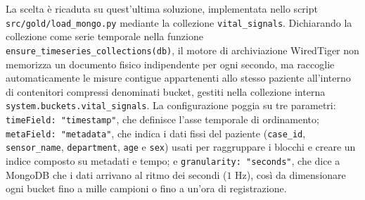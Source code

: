 La scelta \`e ricaduta su quest'ultima soluzione, implementata nello script \texttt{src/gold/load\_mongo.py} mediante la collezione \texttt{vital\_signals}. Dichiarando la collezione come serie temporale nella funzione \texttt{ensure\_timeseries\_collections(db)}, il motore di archiviazione WiredTiger non memorizza un documento fisico indipendente per ogni secondo, ma raccoglie automaticamente le misure contigue appartenenti allo stesso paziente all'interno di contenitori compressi denominati bucket, gestiti nella collezione interna \texttt{system.buckets.vital\_signals}. La configurazione poggia su tre parametri: \texttt{timeField: "timestamp"}, che definisce l'asse temporale di ordinamento; \texttt{metaField: "metadata"}, che indica i dati fissi del paziente (\texttt{case\_id}, \texttt{sensor\_name}, \texttt{department}, \texttt{age} e \texttt{sex}) usati per raggruppare i blocchi e creare un indice composto su metadati e tempo; e \texttt{granularity: "seconds"}, che dice a MongoDB che i dati arrivano al ritmo dei secondi ($1\text{ Hz}$), cos\`i da dimensionare ogni bucket fino a mille campioni o fino a un'ora di registrazione.


